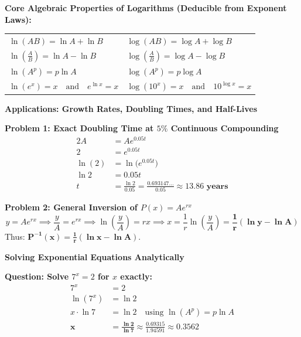 \documentclass[10.5pt]{article}
\begin{document}
\begin{tcolorbox}[colback=boxbg, colframe=boxframe, boxrule=0.8pt, arc=3pt, left=8pt, right=8pt, top=4pt, bottom=4pt]
\textbf{Core Algebraic Properties of Logarithms (Deducible from Exponent Laws):}\\[2pt]
\begin{center}
\renewcommand{\arraystretch}{1.25}
\begin{tabular}{ll}
$\ln(AB) = \ln A + \ln B$ & $\log(AB) = \log A + \log B$ \\
$\ln\left(\frac{A}{B}\right) = \ln A - \ln B$ & $\log\left(\frac{A}{B}\right) = \log A - \log B$ \\
$\ln(A^p) = p \ln A$ & $\log(A^p) = p \log A$ \\
$\ln(e^x) = x \quad \text{and} \quad e^{\ln x} = x$ & $\log(10^x) = x \quad \text{and} \quad 10^{\log x} = x$
\end{tabular}
\end{center}
\end{tcolorbox}

\vspace{0.03in}

\textbf{\large Applications: Growth Rates, Doubling Times, and Half-Lives}

\textbf{Problem 1: Exact Doubling Time at $5\%$ Continuous Compounding}
\begin{align*}
  2A &= A e^{0.05t} \\
  2 &= e^{0.05t} \\
  \ln(2) &= \ln\big(e^{0.05t}\big) \\
  \ln 2 &= 0.05t \\
  t &= \frac{\ln 2}{0.05} = \frac{0.693147\dots}{0.05} \approx \mathbf{13.86 \text{ years}}
\end{align*}

\vspace{0.02in}

\textbf{Problem 2: General Inversion of $P(x) = A e^{rx}$}
\[
  y = A e^{rx} \implies \frac{y}{A} = e^{rx} \implies \ln\left(\frac{y}{A}\right) = rx \implies x = \frac{1}{r}\ln\left(\frac{y}{A}\right) = \mathbf{\frac{1}{r}(\ln y - \ln A)}
\]
Thus: $\mathbf{P^{-1}(x) = \frac{1}{r}(\ln x - \ln A)}$.

\vspace{0.04in}

\textbf{\large Solving Exponential Equations Analytically}

\textbf{Question: Solve $7^x = 2$ for $x$ exactly:}
\begin{align*}
  7^x &= 2 \\
  \ln(7^x) &= \ln 2 \\
  x \cdot \ln 7 &= \ln 2 \quad \text{using } \ln(A^p) = p \ln A \\
  \mathbf{x} &= \mathbf{\frac{\ln 2}{\ln 7}} \approx \frac{0.69315}{1.94591} \approx 0.3562
\end{align*}
\end{document}
